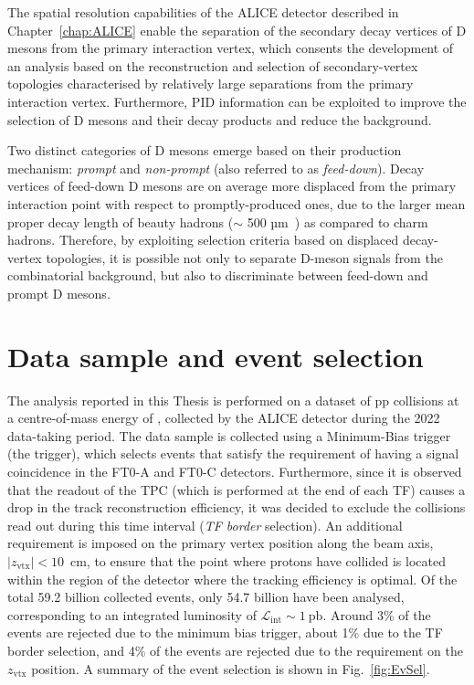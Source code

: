 The spatial resolution capabilities of the ALICE detector described in Chapter~\ref{chap:ALICE} enable the separation of the secondary decay vertices of D mesons from the primary interaction vertex, which consents the development of an analysis based on the reconstruction and selection of secondary-vertex topologies characterised by relatively large separations from the primary interaction vertex. Furthermore, PID information can be exploited to improve the selection of D mesons and their decay products and reduce the background.

Two distinct categories of D mesons emerge based on their production mechanism: \emph{prompt} and \emph{non-prompt} (also referred to as \emph{feed-down}). Decay vertices of feed-down D mesons are on average more displaced from the primary interaction point with respect to promptly-produced ones, due to the larger mean proper decay length of beauty hadrons (\ct $\sim$ 500 µm~\cite{pdg}) as compared to charm hadrons. Therefore, by exploiting selection criteria based on displaced decay-vertex topologies, it is possible not only to separate D-meson signals from the combinatorial background, but also to discriminate between feed-down and prompt D mesons.

\section{Data sample and event selection}
The analysis reported in this Thesis is performed on a dataset of pp collisions at a centre-of-mass energy of \thirteen, collected by the ALICE detector during the 2022 data-taking period. The data sample is collected using a Minimum-Bias trigger (the  trigger), which selects events that satisfy the requirement of having a signal coincidence in the FT0-A and FT0-C detectors. Furthermore, since it is observed that the readout of the TPC (which is performed at the end of each TF) causes a drop in the track reconstruction efficiency, it was decided to exclude the collisions read out during this time interval (\emph{TF border} selection). An additional requirement is imposed on the primary vertex position along the beam axis, $\lvert z_{\mathrm{vtx}}\rvert<10$~cm, to ensure that the point where protons have collided is located within the region of the detector where the tracking efficiency is optimal. Of the total 59.2 billion collected events, only 54.7 billion have been analysed, corresponding to an integrated luminosity of $\mathcal{L}_\mathrm{int}\sim \SI{1}{\pico\barn}$. Around 3\% of the events are rejected due to the minimum bias trigger, about 1\% due to the TF border selection, and 4\% of the events are rejected due to the requirement on the $z_{\mathrm{vtx}}$ position. A summary of the event selection is shown in Fig.~\ref{fig:EvSel}.


